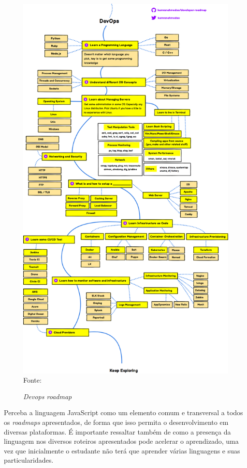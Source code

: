 \documentclass[
	12pt,				%
	openright,			%
	twoside,			%
	a4paper,			%
	english,			%
	brazil				%
	]{abntex2}
\begin{document}
\begin{figure}[h!]
	\centering

	\caption{\textit{Devops roadmap}} \label{fig:DevopsRoadmap}
    \includegraphics[scale=0.29]{devops-roadmap} \\
    Fonte: {\cite{ahmedse_roadmap}}

\end{figure}

Perceba a linguagem JavaScript como um elemento comum e transversal a todos os \textit{roadmaps} apresentados, de forma que isso permita o desenvolvimento em diversas plataformas. É importante ressaltar também de como a presença da linguagem nos diversos roteiros apresentados pode acelerar o aprendizado, uma vez que inicialmente o estudante não terá que aprender várias linguagens e suas particularidades. 
\end{document}
